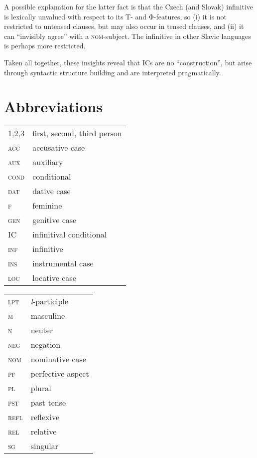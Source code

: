 \documentclass[output=paper,colorlinks,citecolor=brown,
modfonts,newtxmath
]{langscibook}
\begin{document}
\noindent A possible explanation for the latter fact is that the Czech (and Slovak) infinitive is lexically unvalued with respect to its T- and Φ-features, so (i) it is not restricted to untensed clauses, but may also occur in tensed clauses, and (ii) it can ``invisibly agree'' with a \textsc{nom}-subject. The infinitive in other Slavic languages is perhaps more restricted.

Taken all together, these insights reveal that ICs are no ``construction'', but arise through syntactic structure building and are interpreted pragmatically.

\section*{Abbreviations}
\begin{tabularx}{.58\textwidth}{lX}
	1,2,3 & first, second, third person\\
 	\textsc{acc} & accusative case\\
	\textsc{aux} & auxiliary\\
    \textsc{cond} & conditional\\
	\textsc{dat} & dative case\\
	\textsc{f} & feminine \\
	\textsc{gen} & genitive case\\
	IC & infinitival conditional \\
    \textsc{inf} & infinitive\\
	\textsc{ins} & instrumental case\\
	\textsc{loc} & locative case\\
\end{tabularx}
\begin{tabularx}{.38\textwidth}{lX}
	\textsc{lpt} & \textit{l}-participle \\
	\textsc{m} & masculine\\
	\textsc{n} & neuter\\
 	\textsc{neg} & negation\\
	\textsc{nom} & nominative case\\
    \textsc{pf} & perfective aspect\\
	\textsc{pl} & plural\\
    \textsc{pst} & past tense\\
    \textsc{refl} & reflexive\\	
    \textsc{rel} & relative \\
    \textsc{sg} & singular \\
\end{tabularx}
\end{document}
